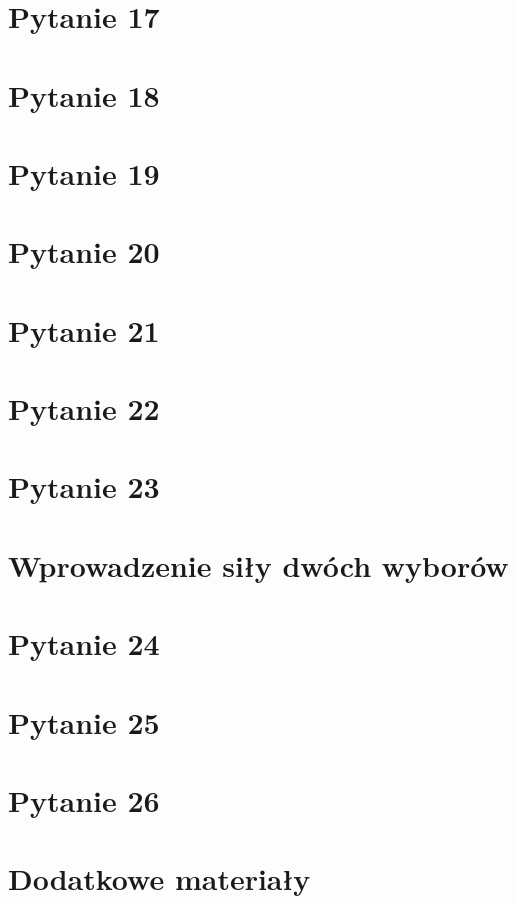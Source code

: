 \documentclass[12pt, a4paper, polish, openany]{book}
\begin{document}
\chapter{Pytanie 17}


\chapter{Pytanie 18}


\chapter{Pytanie 19}


\chapter{Pytanie 20}


\chapter{Pytanie 21}


\chapter{Pytanie 22}


\chapter{Pytanie 23}


\chapter{Wprowadzenie siły dwóch wyborów}


\chapter{Pytanie 24}


\chapter{Pytanie 25}


\chapter{Pytanie 26}


\chapter{Dodatkowe materiały}

\end{document}
